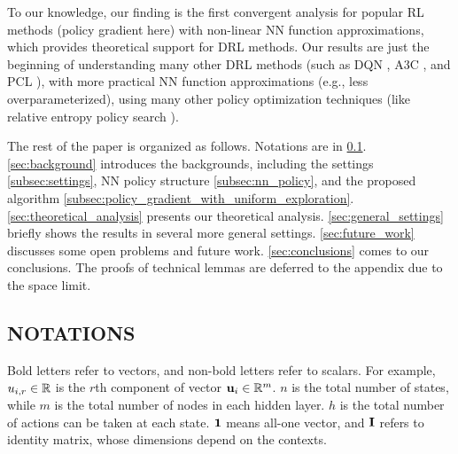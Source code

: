 To our knowledge, our finding is the first convergent analysis for popular RL methods (policy gradient here) with non-linear NN function approximations, which provides theoretical support for DRL methods. Our results are just the beginning of understanding many other DRL methods (such as DQN \cite{mnih2015human}, A3C \citep{mnih2016asynchronous}, and PCL \citep{nachum2017bridging}), with more practical NN function approximations (e.g., less overparameterized), using many other policy optimization techniques (like relative entropy policy search \citep{peters2010relative}).

The rest of the paper is organized as follows. Notations are in \cref{subsec:notations}. \cref{sec:background} introduces the backgrounds, including the settings \cref{subsec:settings}, NN policy structure \cref{subsec:nn_policy}, and the proposed algorithm \cref{subsec:policy_gradient_with_uniform_exploration}. \cref{sec:theoretical_analysis} presents our theoretical analysis. \cref{sec:general_settings} briefly shows the results in several more general settings. \cref{sec:future_work} discusses some open problems and future work. \cref{sec:conclusions} comes to our conclusions. The proofs of technical lemmas are deferred to the appendix due to the space limit.

\subsection{NOTATIONS}
\label{subsec:notations}

Bold letters refer to vectors, and non-bold letters refer to scalars. For example, $u_{i,r} \in {\mathbb{R}}$ is the $r$th component of vector ${\mathbf{u}}_i \in {\mathbb{R}}^m$. $n$ is the total number of states, while $m$ is the total number of nodes in each hidden layer. $h$ is the total number of actions can be taken at each state. ${\mathbf{1}}$ means all-one vector, and ${\mathbf{I}}$ refers to identity matrix, whose dimensions depend on the contexts.

